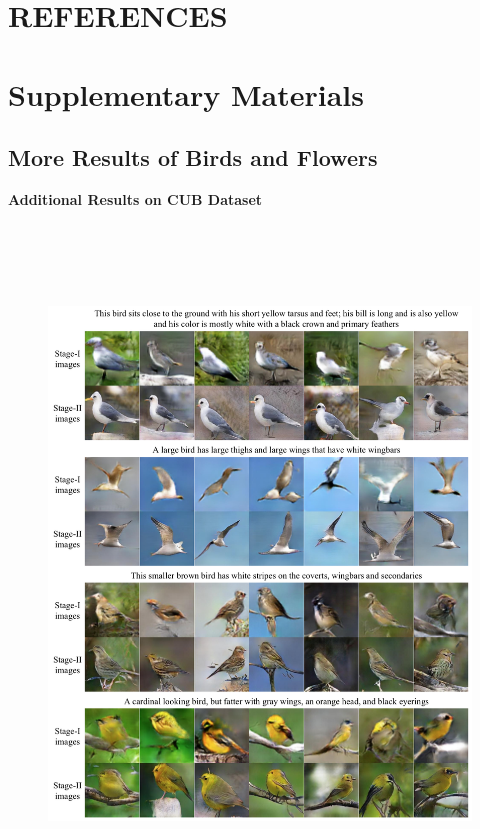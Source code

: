\documentclass[a4paper,12pt,oneside]{article}
\begin{document}
\newpage
\section{REFERENCES}
\begin{thebibliography}{9}
\end{thebibliography}

\newpage
\section{Supplementary Materials}
\subsection{More Results of Birds and Flowers}
\textbf{Additional Results on CUB Dataset}

\begin{figure}[H]
  \centering
  \includegraphics[height=18cm,width=15cm]{Figure9.png}
  \end{figure}
\end{document}

